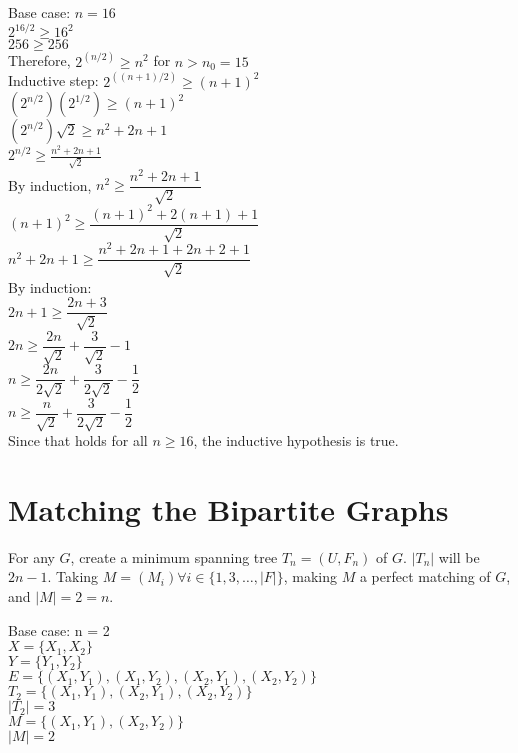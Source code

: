 \documentclass[14pt, letterpaper]{article}
\begin{document}
Base case: $n = 16$ \\
$2^{16/2} \geq 16^2$ \\
$256 \geq 256$ \\
Therefore, $2^(n/2) \geq n^2$ for $n > n_0 = 15$ \\

Inductive step:
$2^{((n+1)/2)} \geq (n+1)^2$ \\
$(2^{n/2})(2^{1/2}) \geq (n+1)^2$ \\
$(2^{n/2})\sqrt 2 \geq n^2 + 2n + 1$ \\
$\displaystyle 2^{n/2} \geq \frac{n^2 + 2n + 1}{\sqrt 2}$ \\
By induction, $n^2 \geq \dfrac{n^2 + 2n + 1}{\sqrt 2}$ \\

$(n+1)^2 \geq \dfrac{(n+1)^2 + 2(n + 1) + 1}{\sqrt 2}$ \\
$n^2 + 2n + 1 \geq \dfrac{n^2 + 2n + 1 + 2n + 2 + 1}{\sqrt 2}$ \\
By induction: \\
$2n + 1 \geq \dfrac{2n + 3}{\sqrt 2}$\\
$2n \geq \dfrac{2n}{\sqrt 2} + \dfrac{3}{\sqrt 2} - 1$\\
$n \geq \dfrac{2n}{2\sqrt 2} + \dfrac{3}{2\sqrt 2} - \dfrac{1}{2}$\\
$n \geq \dfrac{n}{\sqrt 2} + \dfrac{3}{2\sqrt 2} - \dfrac{1}{2}$\\

Since that holds for all $n \geq 16$, the inductive hypothesis is true.

\section{Matching the Bipartite Graphs}
For any $G$, create a minimum spanning tree $T_n = (U, F_n)$ of 
$G$. $|T_n|$ will be $2n - 1$. Taking 
$M = (M_i) \forall i \in \{1, 3, \ldots, |F|\}$, making $M$ a perfect matching
of $G$, and $|M| = 2 = n$.

Base case: n = 2 \\
$X = \{X_1, X_2\}$ \\
$Y = \{Y_1, Y_2\}$ \\
$E = \{(X_1, Y_1), (X_1, Y_2), (X_2, Y_1), (X_2, Y_2)\}$ \\
$T_2 = \{(X_1, Y_1), (X_2, Y_1), (X_2, Y_2)\}$ \\
$|T_2| = 3$ \\
$M = \{(X_1, Y_1), (X_2, Y_2)\}$ \\
$|M| = 2$ \\
\end{document}
